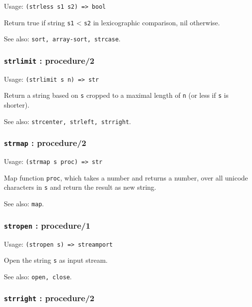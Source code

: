 \documentclass[
]{article}
\newcommand{\passthrough}[1]{#1}
\begin{document}
Usage: \passthrough{\lstinline!(strless s1 s2) => bool!}

Return true if string \passthrough{\lstinline!s1!} \textless{}
\passthrough{\lstinline!s2!} in lexicographic comparison, nil otherwise.

See also: \passthrough{\lstinline!sort, array-sort, strcase!}.

\hypertarget{strlimit-procedure2}{%
\subsubsection{\texorpdfstring{\texttt{strlimit} :
procedure/2}{strlimit : procedure/2}}\label{strlimit-procedure2}}

Usage: \passthrough{\lstinline!(strlimit s n) => str!}

Return a string based on \passthrough{\lstinline!s!} cropped to a
maximal length of \passthrough{\lstinline!n!} (or less if
\passthrough{\lstinline!s!} is shorter).

See also: \passthrough{\lstinline!strcenter, strleft, strright!}.

\hypertarget{strmap-procedure2}{%
\subsubsection{\texorpdfstring{\texttt{strmap} :
procedure/2}{strmap : procedure/2}}\label{strmap-procedure2}}

Usage: \passthrough{\lstinline!(strmap s proc) => str!}

Map function \passthrough{\lstinline!proc!}, which takes a number and
returns a number, over all unicode characters in
\passthrough{\lstinline!s!} and return the result as new string.

See also: \passthrough{\lstinline!map!}.

\hypertarget{stropen-procedure1}{%
\subsubsection{\texorpdfstring{\texttt{stropen} :
procedure/1}{stropen : procedure/1}}\label{stropen-procedure1}}

Usage: \passthrough{\lstinline!(stropen s) => streamport!}

Open the string \passthrough{\lstinline!s!} as input stream.

See also: \passthrough{\lstinline!open, close!}.

\hypertarget{strright-procedure2}{%
\subsubsection{\texorpdfstring{\texttt{strright} :
procedure/2}{strright : procedure/2}}\label{strright-procedure2}}
\end{document}
